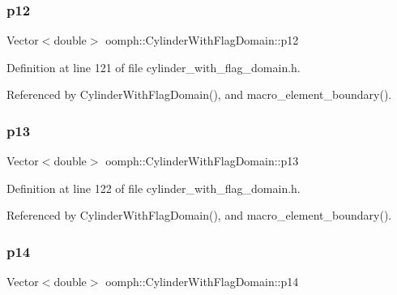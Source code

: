 \subsubsection{\texorpdfstring{p12}{p12}}
{\footnotesize\ttfamily Vector$<$double$>$ oomph\+::\+Cylinder\+With\+Flag\+Domain\+::p12\hspace{0.3cm}{\ttfamily [private]}}



Definition at line 121 of file cylinder\+\_\+with\+\_\+flag\+\_\+domain.\+h.



Referenced by Cylinder\+With\+Flag\+Domain(), and macro\+\_\+element\+\_\+boundary().

\mbox{\label{classoomph_1_1CylinderWithFlagDomain_af96f841048a399c0d5b7cd4519c22d72}} 
\subsubsection{\texorpdfstring{p13}{p13}}
{\footnotesize\ttfamily Vector$<$double$>$ oomph\+::\+Cylinder\+With\+Flag\+Domain\+::p13\hspace{0.3cm}{\ttfamily [private]}}



Definition at line 122 of file cylinder\+\_\+with\+\_\+flag\+\_\+domain.\+h.



Referenced by Cylinder\+With\+Flag\+Domain(), and macro\+\_\+element\+\_\+boundary().

\mbox{\label{classoomph_1_1CylinderWithFlagDomain_ac07282a9f587fc6f10b81506c59a2001}} 
\subsubsection{\texorpdfstring{p14}{p14}}
{\footnotesize\ttfamily Vector$<$double$>$ oomph\+::\+Cylinder\+With\+Flag\+Domain\+::p14\hspace{0.3cm}{\ttfamily [private]}}




